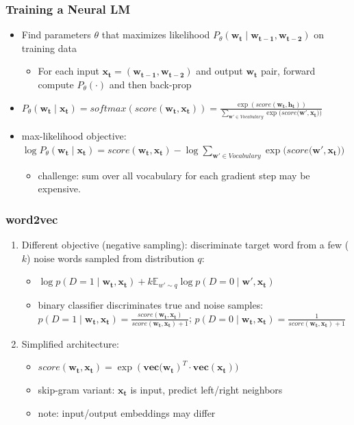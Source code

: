 \documentclass{beamer}
\newcommand{\bi}{\begin{itemize}}
\newcommand{\ei}{\end{itemize}}
\newcommand{\be}{\begin{enumerate}}
\newcommand{\ee}{\end{enumerate}}
\begin{document}
\begin{frame}
\begin{columns}
{}
\end{columns}
\end{frame}

\begin{frame}
\frametitle{Training a Neural LM}
\bi
\item Find parameters $\theta$ that maximizes likelihood $P_{\theta}(\mathbf{w_t} \mid \mathbf{w_{t-1}}, \mathbf{w_{t-2}})$ on training data
	\bi
	\item For each input $\mathbf{x_{t}} = (\mathbf{w_{t-1}}, \mathbf{w_{t-2}})$ and output $\mathbf{w_t} $ pair, forward compute $P_\theta(\cdot)$ and then back-prop 
	\ei
\pause
\item $P_{\theta}(\mathbf{w_t} \mid \mathbf{x_{t}}) = softmax(score(\mathbf{w_t} , \mathbf{x_{t}})) = \frac{ \exp(score(\mathbf{w_t} , \mathbf{h_{t}})) }{\sum_{\mathbf{w'}  \in Vocabulary} \exp(score(\mathbf{w'} , \mathbf{x_{t}))}   }$
\item max-likelihood objective: $\log P_{\theta}(\mathbf{w_t} \mid \mathbf{x_{t}})  = score(\mathbf{w_t} , \mathbf{x_{t}}) - \log \sum_{\mathbf{w'}  \in Vocabulary} \exp(score(\mathbf{w'} , \mathbf{x_{t}))}  $
	\bi
	\item challenge: sum over all vocabulary for each gradient step may be expensive. 
	\ei
\ei
\end{frame}

\begin{frame}
\frametitle{word2vec \cite{mikolov13distributed}}
\be
\item Different objective (negative sampling): discriminate target word from a few ($k$) noise words sampled from distribution $q$:
	\bi
	\item $\log p(D=1\mid \mathbf{w_t} , \mathbf{x_{t}}) + k \mathbb{E}_{w' \sim q}  \log p(D=0 \mid \mathbf{w'} , \mathbf{x_{t}}) $
	\item binary classifier discriminates true and noise samples: $p(D=1 \mid \mathbf{w_t} , \mathbf{x_{t}}) = \frac{score(\mathbf{w_t} , \mathbf{x_{t}})}{ score(\mathbf{w_t} , \mathbf{x_{t}}) + 1  } $; $p(D=0 \mid \mathbf{w_t} , \mathbf{x_{t}}) = \frac{ 1 }{ score(\mathbf{w_t} , \mathbf{x_{t}}) + 1  } $
	\ei
\pause
\item Simplified architecture: 
	\bi
	\item $score(\mathbf{w_t} , \mathbf{x_{t}}) = \exp(\mathbf{vec(w_t})^T \cdot \mathbf{vec(x_t)})$
	\item skip-gram variant: $ \mathbf{x_{t}}$ is input,  predict left/right neighbors
	\item note: input/output embeddings may differ
	\ei
\ee
\end{frame}
\end{document}
